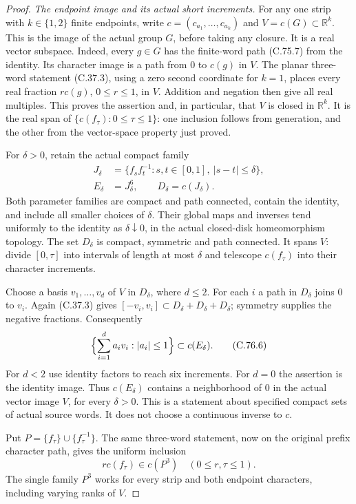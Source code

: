 \begin{proof}
\emph{The endpoint image and its actual short increments.}
For any one strip with $k\in\{1,2\}$ finite endpoints,
write $c=(c_{a_1},\ldots,c_{a_k})$ and $V=c(G)\subset\mathbb R^k$.
This is the image of the actual group $G$, before taking
any closure. It is a real vector subspace. Indeed, every
$g\in G$ has the finite-word path (C.75.7) from the identity.
Its character image is a path from $0$ to $c(g)$ in $V$.
The planar three-word statement (C.37.3), using a zero
second coordinate for $k=1$, places every real fraction
$r c(g)$, $0\leq r\leq1$, in $V$. Addition and negation
then give all real multiples. This proves the assertion
and, in particular, that $V$ is closed in $\mathbb R^k$.
It is the real span of $\{c(f_\tau):0\leq\tau\leq1\}$:
one inclusion follows from generation, and the other from
the vector-space property just proved.

For $\delta>0$, retain the actual compact family
\[
 \begin{split}
 J_\delta&=\{f_s f_t^{-1}:s,t\in[0,1],\ |s-t|\leq\delta\},\\
 E_\delta&=J_\delta^6,
 \qquad D_\delta=c(J_\delta).
 \end{split}                                                   \tag{C.76.5}
\]
Both parameter families are compact and path connected,
contain the identity, and include all smaller choices of
$\delta$. Their global maps and inverses tend uniformly
to the identity as $\delta\downarrow0$, in the actual
closed-disk homeomorphism topology. The set $D_\delta$
is compact, symmetric and path connected. It spans $V$:
divide $[0,\tau]$ into intervals of length at most $\delta$
and telescope $c(f_\tau)$ into their character increments.

Choose a basis $v_1,\ldots,v_d$ of $V$ in $D_\delta$,
where $d\leq2$. For each $i$ a path in $D_\delta$ joins
$0$ to $v_i$. Again (C.37.3) gives
$[-v_i,v_i]\subset D_\delta+D_\delta+D_\delta$;
symmetry supplies the negative fractions. Consequently
\[
 \Bigl\{\sum_{i=1}^d a_i v_i:|a_i|\leq1\Bigr\}
       \subset c(E_\delta).
                                                               \tag{C.76.6}
\]
For $d<2$ use identity factors to reach six increments.
For $d=0$ the assertion is the identity image.
Thus $c(E_\delta)$ contains a neighborhood of $0$ in the
actual vector image $V$, for every $\delta>0$. This is a
statement about specified compact sets of actual source
words. It does not choose a continuous inverse to $c$.

Put $P=\{f_\tau\}\cup\{f_\tau^{-1}\}$. The same three-word
statement, now on the original prefix character path,
gives the uniform inclusion
\[
               r c(f_\tau)\in c(P^3)
                           \quad(0\leq r,\tau\leq1).
                                                               \tag{C.76.7}
\]
The single family $P^3$ works for every strip and both
endpoint characters, including varying ranks of $V$.


\end{proof}
